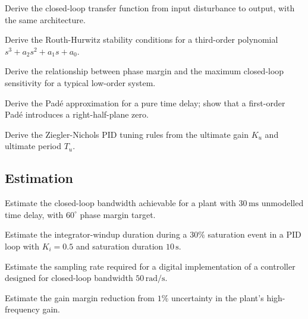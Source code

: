 \begin{exercise}
Derive the closed-loop transfer function from input disturbance to output, with the same architecture.
\end{exercise}

\begin{exercise}
Derive the Routh-Hurwitz stability conditions for a third-order polynomial $s^3 + a_2 s^2 + a_1 s + a_0$.
\end{exercise}

\begin{exercise}
Derive the relationship between phase margin and the maximum closed-loop sensitivity for a typical low-order system.
\end{exercise}

\begin{exercise}
Derive the Pad\'e approximation for a pure time delay; show that a first-order Pad\'e introduces a right-half-plane zero.
\end{exercise}

\begin{exercise}
Derive the Ziegler-Nichols PID tuning rules from the ultimate gain $K_u$ and ultimate period $T_u$.
\end{exercise}

\subsection*{Estimation}

\begin{exercise}
Estimate the closed-loop bandwidth achievable for a plant with $30\,\text{ms}$ unmodelled time delay, with $60^\circ$ phase margin target.
\end{exercise}

\begin{exercise}
Estimate the integrator-windup duration during a $30\%$ saturation event in a PID loop with $K_i = 0.5$ and saturation duration $10\,\text{s}$.
\end{exercise}

\begin{exercise}
Estimate the sampling rate required for a digital implementation of a controller designed for closed-loop bandwidth $50\,\text{rad/s}$.
\end{exercise}

\begin{exercise}
Estimate the gain margin reduction from $1\%$ uncertainty in the plant's high-frequency gain.
\end{exercise}

